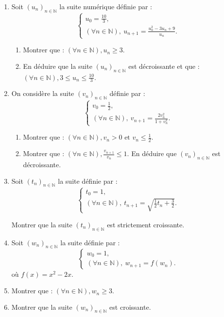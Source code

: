 \documentclass[12pt]{article}
\begin{document}
\begin{enumerate}

\item Soit \((u_n)_{n \in \mathbb{N}}\) la suite numérique définie par :
\[
\begin{cases}
u_0 = \frac{10}{3}, \\
(\forall n \in \mathbb{N}), \ u_{n+1} = \frac{u_n^2 - 3u_n + 9}{u_n}.
\end{cases}
\]

\begin{enumerate}
    \item Montrer que : \((\forall n \in \mathbb{N}), u_n \geq 3\).
    \item En déduire que la suite \((u_n)_{n \in \mathbb{N}}\) est décroissante et que : \((\forall n \in \mathbb{N}), 3 \leq u_n \leq \frac{10}{3}\).
\end{enumerate}

\item On considère la suite \((v_n)_{n \in \mathbb{N}}\) définie par :
\[
\begin{cases}
v_0 = \frac{1}{2}, \\
(\forall n \in \mathbb{N}), \ v_{n+1} = \frac{2v_n^2}{1 + v_n^2}.
\end{cases}
\]

\begin{enumerate}
    \item Montrer que : \((\forall n \in \mathbb{N}), v_n > 0 \text{ et } v_n \leq \frac{1}{2}\).
    \item Montrer que : \((\forall n \in \mathbb{N}), \frac{v_{n+1}}{v_n}  \leq 1\). En déduire que \((v_n)_{n \in \mathbb{N}}\) est décroissante.
\end{enumerate}

\item Soit \((t_n)_{n \in \mathbb{N}}\) la suite définie par :
\[
\begin{cases}
t_0 = 1, \\
(\forall n \in \mathbb{N}), \ t_{n+1} = \sqrt{\frac{1}{2} t_n + \frac{3}{2}}.
\end{cases}
\]

Montrer que la suite \((t_n)_{n \in \mathbb{N}}\) est strictement croissante.

\item Soit \((w_n)_{n \in \mathbb{N}}\) la suite définie par :
\[
\begin{cases}
w_0 = 1, \\
(\forall n \in \mathbb{N}), \ w_{n+1} = f(w_n).
\end{cases}
\]
où \(f(x) = x^2 - 2x\).

\item Montrer que : \((\forall n \in \mathbb{N}), w_n \geq 3\).
\item Montrer que la suite \((w_n)_{n \in \mathbb{N}}\) est croissante.
\end{enumerate}
\end{document}
